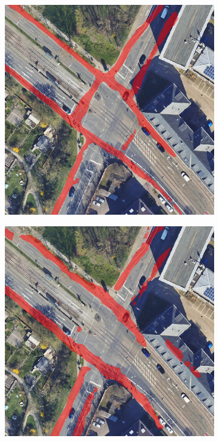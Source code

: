 \begin{figure}
\begin{subfigure}{.45\textwidth}
		\caption{}
	\end{subfigure} 
	\begin{subfigure}{.45\textwidth}
		\centering
		\includegraphics[width=1.\linewidth]{Bilder/annotation-mistake/fitting-vbunet-r.png}
		\caption{}
	\end{subfigure}
	\begin{subfigure}{.45\textwidth}
		\centering
		\includegraphics[width=1.\linewidth]{Bilder/annotation-mistake/full-vbunet-s.png}
		\caption{}
	\end{subfigure}


\end{figure}
